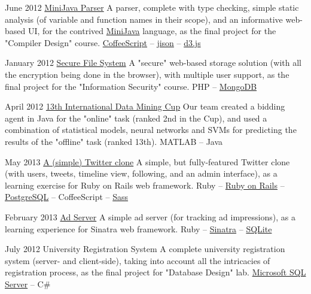 \documentclass{tccv}
\begin{document}
\begin{project_list}
\item{June 2012}
	 {}
	 {\href{https://github.com/pooriaazimi/Mini-Java}{MiniJava Parser}}
	 {A parser, complete with type checking, simple static analysis (of variable and function names in their scope), and an informative web-based UI, for the contrived \href{http://www.cambridge.org/resources/052182060X/MCIIJ2e/grammar.htm}{MiniJava} language, as the final project for the "Compiler Design" course.}
	 {\href{http://coffeescript.org}{CoffeeScript} -- \href{http://zaach.github.io/jison/}{jison} -- \href{http://d3js.org}{d3.js}}

\item{January 2012}
	 {}
	 {\href{https://github.com/pooriaazimi/secure_file_system}{Secure File System}}
	 {A "secure" web-based storage solution (with all the encryption being done in the browser), with multiple user support, as the final project for the "Information Security" course.}
	 {PHP -- \href{http://www.mongodb.org}{MongoDB}}


\item{April 2012}
	 {}
	 {\href{http://www.data-mining-cup.de/en/review/dmc-2012/}{13th International Data Mining Cup}}
	 {Our team created a bidding agent in Java for the "online" task (ranked 2nd in the Cup), and used a combination of statistical models, neural networks and SVMs for predicting the results of the "offline" task (ranked 13th).}
	 {
	 	MATLAB -- 
	 	Java
	 }


\item{May 2013}
	 {}
	 {\href{https://github.com/pooriaazimi/twitter}{A (simple) Twitter clone}}
	 {A simple, but fully-featured Twitter clone (with users, tweets, timeline view, following, and an admin interface), as a learning exercise for Ruby on Rails web framework.}
	 {
		 Ruby -- 
		 \href{http://rubyonrails.org}{Ruby on Rails} -- 
		 \href{http://www.postgresql.org}{PostgreSQL} -- 
		 CoffeeScript -- 
		 \href{http://sass-lang.com}{Sass}
	 }


\item{February 2013}
	 {}
	 {\href{https://github.com/pooriaazimi/adserver}{Ad Server}}
	 {A simple ad server (for tracking ad impressions), as a learning experience for Sinatra web framework.}
	 {
	 	Ruby -- 
		\href{http://www.sinatrarb.com}{Sinatra} -- 
		\href{http://www.sqlite.org}{SQLite}
	 }


\item{July 2012}
	 {}
	 {University Registration System}
	 {A complete university registration system (server- and client-side), taking into account all the intricacies of registration process, as the final project for "Database Design" lab.}
	 {
	 	\href{http://www.microsoft.com/en-us/sqlserver/default.aspx}{Microsoft SQL Server} -- 
		C\#
	 }
	 

\end{project_list}
\end{document}
